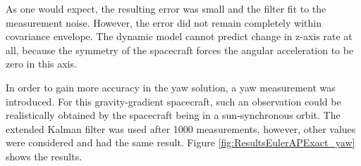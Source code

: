 \documentclass[]{aiaa-tc}%
\begin{document}
As one would expect, the resulting error was small and the filter fit to the measurement noise. However, the error did not remain completely within covariance envelope. The dynamic model cannot predict change in z-axis rate at all, because the symmetry of the spacecraft forces the angular acceleration to be zero in this axis. 

	\vspace{5 mm}

In order to gain more accuracy in the yaw solution, a yaw measurement was introduced. For this gravity-gradient spacecraft, such an observation could be realistically obtained by the spacecraft being in a sun-synchronous orbit. The extended Kalman filter was used after 1000 measurements, however, other values were considered and had the same result. Figure \ref{fig:ResultsEulerAPExact_yaw} shows the results.
\end{document}
